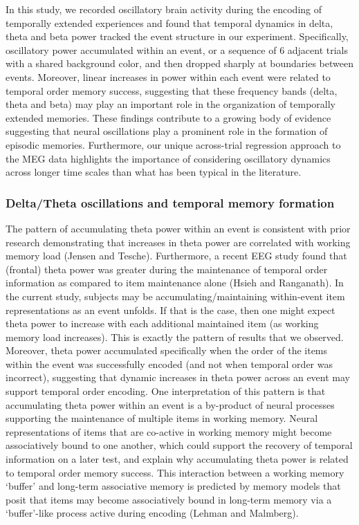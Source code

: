 In this study, we recorded oscillatory brain activity during the
encoding of temporally extended experiences and found that temporal
dynamics in delta, theta and beta power tracked the event structure in
our experiment. Specifically, oscillatory power accumulated within an
event, or a sequence of 6 adjacent trials with a shared background
color, and then dropped sharply at boundaries between events. Moreover,
linear increases in power within each event were related to temporal
order memory success, suggesting that these frequency bands (delta,
theta and beta) may play an important role in the organization of
temporally extended memories. These findings contribute to a growing
body of evidence suggesting that neural oscillations play a prominent
role in the formation of episodic memories. Furthermore, our unique
across-trial regression approach to the MEG data highlights the
importance of considering oscillatory dynamics across longer time scales
than what has been typical in the literature.

\subsubsection{Delta/Theta oscillations and temporal memory
formation}\label{deltatheta-oscillations-and-temporal-memory-formation}

The pattern of accumulating theta power within an event is consistent
with prior research demonstrating that increases in theta power are
correlated with working memory load (Jensen and Tesche). Furthermore, a
recent EEG study found that (frontal) theta power was greater during the
maintenance of temporal order information as compared to item
maintenance alone (Hsieh and Ranganath). In the current study, subjects
may be accumulating/maintaining within-event item representations as an
event unfolds. If that is the case, then one might expect theta power to
increase with each additional maintained item (as working memory load
increases). This is exactly the pattern of results that we observed.
Moreover, theta power accumulated specifically when the order of the
items within the event was successfully encoded (and not when temporal
order was incorrect), suggesting that dynamic increases in theta power
across an event may support temporal order encoding. One interpretation
of this pattern is that accumulating theta power within an event is a
by-product of neural processes supporting the maintenance of multiple
items in working memory. Neural representations of items that are
co-active in working memory might become associatively bound to one
another, which could support the recovery of temporal information on a
later test, and explain why accumulating theta power is related to
temporal order memory success. This interaction between a working memory
`buffer' and long-term associative memory is predicted by memory models
that posit that items may become associatively bound in long-term memory
via a `buffer'-like process active during encoding (Lehman and
Malmberg).

